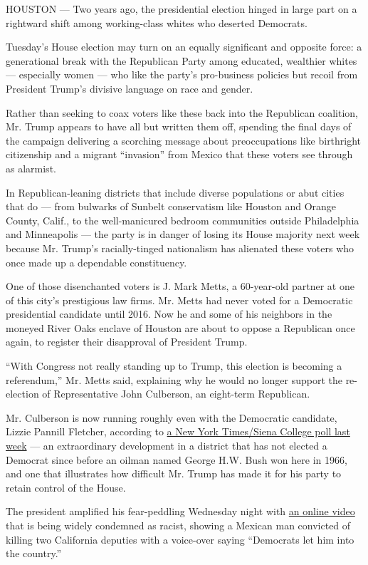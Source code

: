 HOUSTON --- Two years ago, the presidential election hinged in large
part on a rightward shift among working-class whites who deserted
Democrats.

Tuesday's House election may turn on an equally significant and opposite
force: a generational break with the Republican Party among educated,
wealthier whites --- especially women --- who like the party's
pro-business policies but recoil from President Trump's divisive
language on race and gender.

Rather than seeking to coax voters like these back into the Republican
coalition, Mr. Trump appears to have all but written them off, spending
the final days of the campaign delivering a scorching message about
preoccupations like birthright citizenship and a migrant ``invasion''
from Mexico that these voters see through as alarmist.

In Republican-leaning districts that include diverse populations or abut
cities that do --- from bulwarks of Sunbelt conservatism like Houston
and Orange County, Calif., to the well-manicured bedroom communities
outside Philadelphia and Minneapolis --- the party is in danger of
losing its House majority next week because Mr. Trump's racially-tinged
nationalism has alienated these voters who once made up a dependable
constituency.

One of those disenchanted voters is J. Mark Metts, a 60-year-old partner
at one of this city's prestigious law firms. Mr. Metts had never voted
for a Democratic presidential candidate until 2016. Now he and some of
his neighbors in the moneyed River Oaks enclave of Houston are about to
oppose a Republican once again, to register their disapproval of
President Trump.

``With Congress not really standing up to Trump, this election is
becoming a referendum,'' Mr. Metts said, explaining why he would no
longer support the re-election of Representative John Culberson, an
eight-term Republican.

Mr. Culberson is now running roughly even with the Democratic candidate,
Lizzie Pannill Fletcher, according to
\href{https://www.nytimes3xbfgragh.onion/interactive/2018/upshot/elections-poll-tx07-3.html}{a
New York Times/Siena College poll last week} --- an extraordinary
development in a district that has not elected a Democrat since before
an oilman named George H.W. Bush won here in 1966, and one that
illustrates how difficult Mr. Trump has made it for his party to retain
control of the House.

The president amplified his fear-peddling Wednesday night with
\href{https://twitter.com/realDonaldTrump/status/1057728445386539008}{an
online video} that is being widely condemned as racist, showing a
Mexican man convicted of killing two California deputies with a
voice-over saying ``Democrats let him into the country.''

